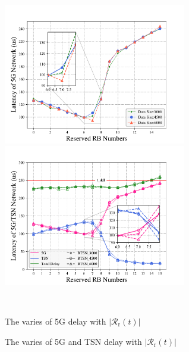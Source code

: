 \documentclass{SCIS2021}
\begin{document}
	\begin{figure}[t]
		\centering
		\vspace{-0.3cm}
		\begin{minipage}[c]{0.48\textwidth}
			\centering
			\includegraphics[width=8cm]{res_t5g}
		\end{minipage}
		\hspace{0.02\textwidth}
		\begin{minipage}[c]{0.48\textwidth}
			\centering
			\includegraphics[width=8cm]{res_t5g_ttsn}
		\end{minipage}\\[3mm]
		\begin{minipage}[t]{0.48\textwidth}
			\centering
			\caption{The varies of 5G delay with  $\left|\mathcal{R}_\mathrm{r}(t)\right|$}
			\label{fig:res-5g}
		\end{minipage}
		\hspace{0.02\textwidth}
		\begin{minipage}[t]{0.48\textwidth}
			\centering
			\caption{The varies of 5G and TSN delay with $\left|\mathcal{R}_\mathrm{r}(t)\right|$}
			\label{fig:res-5g/tsn}
		\end{minipage}
		\vspace{-0.3cm}
	\end{figure}
\end{document}
